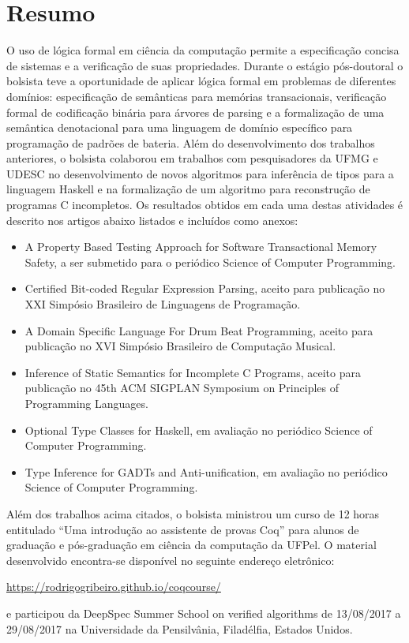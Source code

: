 \documentclass[a4paper, 12pt]{article}
\begin{document}
\section{Resumo}

O uso de lógica formal em ciência da computação permite a especificação concisa
de sistemas e a verificação de suas propriedades. Durante o estágio pós-doutoral
o bolsista teve a oportunidade de aplicar lógica formal em problemas de
diferentes domínios: especificação de semânticas para memórias transacionais,
verificação formal de codificação binária para árvores de parsing e a formalização
de uma semântica denotacional para uma linguagem de domínio específico para
programação de padrões de bateria. Além do desenvolvimento dos trabalhos
anteriores, o bolsista colaborou em trabalhos com pesquisadores da UFMG e UDESC
no desenvolvimento de novos algoritmos para inferência de tipos para a linguagem
Haskell e na formalização de um algoritmo para
reconstrução de programas C incompletos. Os resultados obtidos em cada uma
destas atividades é descrito nos artigos abaixo listados e incluídos como anexos:

\begin{itemize}
  \item A Property Based Testing Approach for Software Transactional Memory
    Safety, a ser submetido para o periódico Science of Computer Programming.
  \item Certified Bit-coded Regular Expression Parsing, aceito para publicação
    no XXI Simpósio Brasileiro de Linguagens de Programação.
  \item A Domain Specific Language For Drum Beat Programming, aceito para
    publicação no XVI Simpósio Brasileiro de Computação Musical.
  \item Inference of Static Semantics for Incomplete C Programs, aceito para
    publicação no 45th ACM SIGPLAN Symposium on Principles of Programming
    Languages.
  \item Optional Type Classes for Haskell, em avaliação no periódico Science of
    Computer Programming.
  \item Type Inference for GADTs and Anti-unification, em avaliação no periódico
    Science of Computer Programming.
\end{itemize}

Além dos trabalhos acima citados, o bolsista ministrou um curso de 12 horas
entitulado ``Uma introdução ao assistente de provas Coq'' para
alunos de graduação e pós-graduação em ciência da computação da UFPel. O
material desenvolvido encontra-se disponível no seguinte endereço eletrônico:
\begin{center}
  \url{https://rodrigogribeiro.github.io/coqcourse/}
\end{center}
e participou da DeepSpec Summer School on verified algorithms de 13/08/2017 a
29/08/2017 na Universidade da Pensilvânia, Filadélfia, Estados Unidos.
\end{document}
